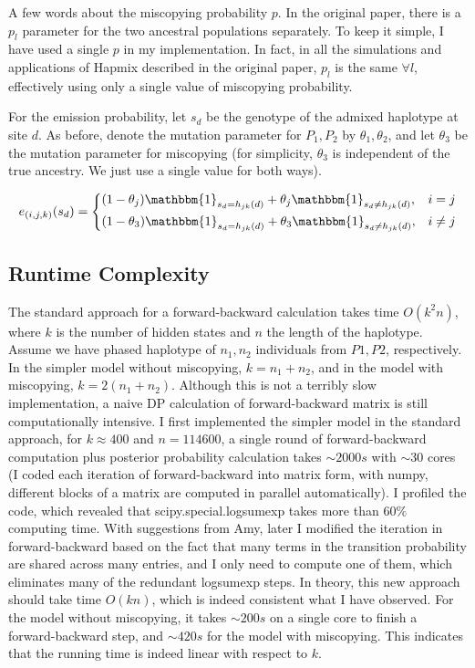 \documentclass{article}
\begin{document}
A few words about the miscopying probability $p$. In the original paper\cite{hapmix}, there is a $p_l$ parameter for the two ancestral populations separately. To keep it simple, I have used a single $p$ in my implementation. In fact, in all the simulations and applications of Hapmix described in the original paper\cite{hapmix}, $p_l$ is the same $\forall l$, effectively using only a single value of miscopying probability.

For the emission probability, let $s_d$ be the genotype of the admixed haplotype at site $d$. As before, denote the mutation parameter for $P_1,P_2$ by $\theta_1,\theta_2$, and let $\theta_3$ be the mutation parameter for miscopying (for simplicity, $\theta_3$ is independent of the true ancestry. We just use a single value for both ways).

\[
e_{(i,j,k)}(s_d)=
\begin{dcases}
(1-\theta_j)\mathbbm{1}_{s_d=h_{jk}(d)}+\theta_j\mathbbm{1}_{s_d\neq h_{jk}(d)},&i=j\\
(1-\theta_3)\mathbbm{1}_{s_d=h_{jk}(d)}+\theta_3\mathbbm{1}_{s_d\neq h_{jk}(d)},&i\neq j
\end{dcases}
\]


\subsection{Runtime Complexity}

The standard approach for a forward-backward calculation takes time $O(k^2n)$, where $k$ is the number of hidden states and $n$ the length of the haplotype. Assume we have phased haplotype of $n_1,n_2$ individuals from $P1,P2$, respectively. In the simpler model without miscopying, $k=n_1+n_2$, and in the model with miscopying, $k=2(n_1+n_2)$. Although this is not a terribly slow implementation, a naive DP calculation of forward-backward matrix is still computationally intensive. I first implemented the simpler model in the standard approach, for $k\approx 400$ and $n=114600$, a single round of forward-backward computation plus posterior probability calculation takes $\sim 2000s$ with $\sim 30$ cores (I coded each iteration of forward-backward into matrix form, with numpy, different blocks of a matrix are computed in parallel automatically). I profiled the code, which revealed that scipy.special.logsumexp takes more than $60\%$ computing time. With suggestions from Amy, later I modified the iteration in forward-backward based on the fact that many terms in the transition probability are shared across many entries, and I only need to compute one of them, which eliminates many of the redundant logsumexp steps. In theory, this new approach should take time $O(kn)$, which is indeed consistent what I have observed. For the model without miscopying, it takes $\sim 200s$ on a single core to finish a forward-backward step, and $\sim 420s$ for the model with miscopying. This indicates that the running time is indeed linear with respect to $k$.
\end{document}
